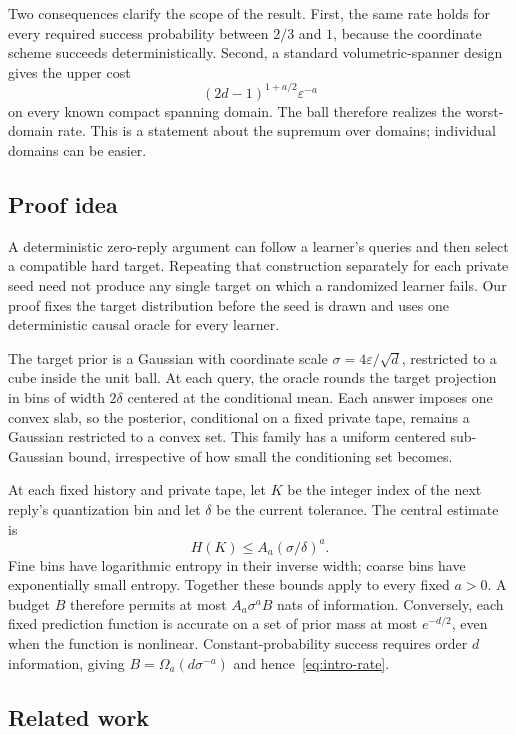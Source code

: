 \documentclass[11pt,a4paper]{article}
\newcommand{\eps}{\varepsilon}
\theoremstyle{definition}
\theoremstyle{remark}
\begin{document}
Two consequences clarify the scope of the result. First, the same rate holds for every required success probability between $2/3$ and $1$, because the coordinate scheme succeeds deterministically. Second, a standard volumetric-spanner design~\cite{HKM14,BMV23} gives the upper cost
\[
 (2d-1)^{1+a/2}\eps^{-a}
\]
on every known compact spanning domain. The ball therefore realizes the worst-domain rate. This is a statement about the supremum over domains; individual domains can be easier.

\subsection{Proof idea}
A deterministic zero-reply argument can follow a learner's queries and then select a compatible hard target. Repeating that construction separately for each private seed need not produce any single target on which a randomized learner fails. Our proof fixes the target distribution before the seed is drawn and uses one deterministic causal oracle for every learner.

The target prior is a Gaussian with coordinate scale $\sigma=4\eps/\sqrt d$, restricted to a cube inside the unit ball. At each query, the oracle rounds the target projection in bins of width $2\delta$ centered at the conditional mean. Each answer imposes one convex slab, so the posterior, conditional on a fixed private tape, remains a Gaussian restricted to a convex set. This family has a uniform centered sub-Gaussian bound, irrespective of how small the conditioning set becomes.

At each fixed history and private tape, let $K$ be the integer index of the next reply's quantization bin and let $\delta$ be the current tolerance. The central estimate is
\[
 H(K)
 \le A_a(\sigma/\delta)^a.
\]
Fine bins have logarithmic entropy in their inverse width; coarse bins have exponentially small entropy. Together these bounds apply to every fixed $a>0$. A budget $B$ therefore permits at most $A_a\sigma^a B$ nats of information. Conversely, each fixed prediction function is accurate on a set of prior mass at most $e^{-d/2}$, even when the function is nonlinear. Constant-probability success requires order $d$ information, giving $B=\Omega_a(d\sigma^{-a})$ and hence~\eqref{eq:intro-rate}.

\subsection{Related work}\label{sec:related}
\end{document}
